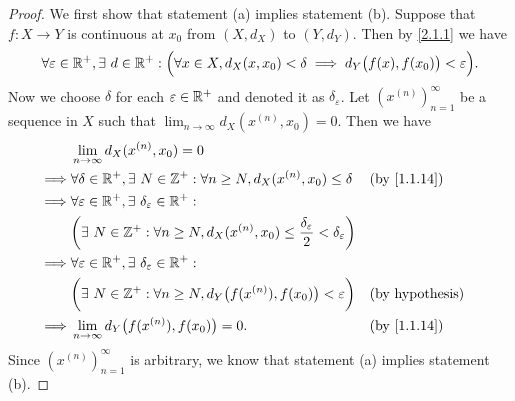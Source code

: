 \begin{proof}
  We first show that statement (a) implies statement (b).
  Suppose that \(f : X \to Y\) is continuous at \(x_0\) from \((X, d_X)\) to \((Y, d_Y)\).
  Then by \cref{2.1.1} we have
  \[
    \forall \varepsilon \in \mathbb{R}^+, \exists\ d \in \mathbb{R}^+ : \Big(\forall x \in X, d_X(x, x_0) < \delta \implies d_Y\big(f(x), f(x_0)\big) < \varepsilon\Big).
  \]
  Now we choose \(\delta\) for each \(\varepsilon \in \mathbb{R}^+\) and denoted it as \(\delta_\varepsilon\).
  Let \((x^{(n)})_{n = 1}^\infty\) be a sequence in \(X\) such that \(\lim_{n \to \infty} d_X(x^{(n)}, x_0) = 0\).
  Then we have
  \begin{align*}
             & \lim_{n \to \infty} d_X(x^{(n)}, x_0) = 0                                                                                                                    \\
    \implies & \forall \delta \in \R^+, \exists\ N \in \Z^+ : \forall n \geq N, d_X(x^{(n)}, x_0) \leq \delta                                &  & \text{(by \cref{1.1.14})} \\
    \implies & \forall \varepsilon \in \R^+, \exists\ \delta_\varepsilon \in \R^+ :                                                                                         \\
             & \bigg(\exists\ N \in \Z^+ : \forall n \geq N, d_X(x^{(n)}, x_0) \leq \dfrac{\delta_\varepsilon}{2} < \delta_\varepsilon\bigg)                                \\
    \implies & \forall \varepsilon \in \R^+, \exists\ \delta_\varepsilon \in \R^+ :                                                                                         \\
             & \bigg(\exists\ N \in \Z^+ : \forall n \geq N, d_Y\big(f(x^{(n)}), f(x_0)\big) < \varepsilon\bigg)                             &  & \text{(by hypothesis)}    \\
    \implies & \lim_{n \to \infty} d_Y\big(f(x^{(n)}), f(x_0)\big) = 0.                                                                      &  & \text{(by \cref{1.1.14})}
  \end{align*}
  Since \((x^{(n)})_{n = 1}^\infty\) is arbitrary, we know that statement (a) implies statement (b).


\end{proof}
